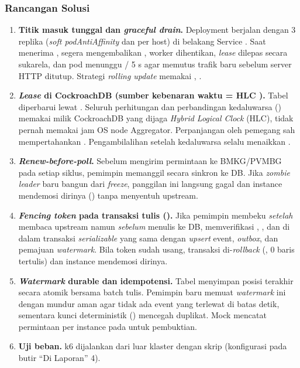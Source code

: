 \subsubsection{Rancangan Solusi}
\begin{enumerate}
\item \textbf{Titik masuk tunggal dan \textit{graceful drain}.} Deployment  berjalan dengan 3 replika (\textit{soft podAntiAffinity} dan  per host) di belakang Service . Saat menerima ,  segera mengembalikan , worker dihentikan, \textit{lease} dilepas secara sukarela, dan pod menunggu  /  5 s agar  memutus trafik baru sebelum server HTTP ditutup. Strategi \textit{rolling update} memakai , .
\item \textbf{\textit{Lease} di CockroachDB (sumber kebenaran waktu = HLC ).} Tabel  diperbarui lewat . Seluruh perhitungan dan perbandingan kedaluwarsa () memakai  milik CockroachDB yang dijaga \textit{Hybrid Logical Clock} (HLC), tidak pernah memakai jam OS node Aggregator. Perpanjangan oleh pemegang sah mempertahankan . Pengambilalihan setelah kedaluwarsa selalu menaikkan .
\item \textbf{\textit{Renew-before-poll}.} Sebelum mengirim permintaan ke BMKG/PVMBG pada setiap siklus, pemimpin memanggil  secara sinkron ke DB. Jika \textit{zombie leader} baru bangun dari \textit{freeze}, panggilan ini langsung gagal dan instance mendemosi dirinya () tanpa menyentuh upstream.
\item \textbf{\textit{Fencing token} pada transaksi tulis ().} Jika pemimpin membeku \textit{setelah} membaca upstream namun \textit{sebelum} menulis ke DB,  memverifikasi , , dan  di dalam transaksi \textit{serializable} yang sama dengan \textit{upsert} event, \textit{outbox}, dan pemajuan \textit{watermark}. Bila token sudah usang, transaksi di-\textit{rollback} (, 0 baris tertulis) dan instance mendemosi dirinya.
\item \textbf{\textit{Watermark} durable dan idempotensi.} Tabel  menyimpan posisi terakhir secara atomik bersama batch tulis. Pemimpin baru memuat \textit{watermark} ini dengan mundur aman  agar tidak ada event yang terlewat di batas detik, sementara kunci deterministik  () mencegah duplikat. Mock mencatat permintaan per instance pada  untuk pembuktian.
\item \textbf{Uji beban.} k6 dijalankan dari luar klaster dengan skrip  (konfigurasi pada butir ``Di Laporan'' 4).
\end{enumerate}


